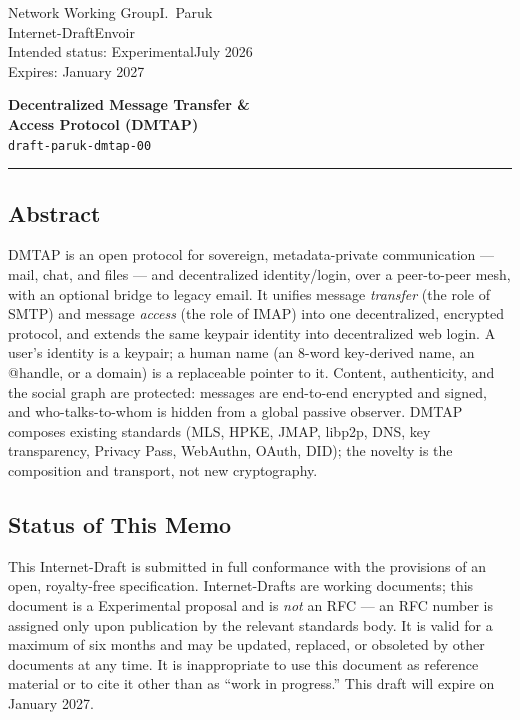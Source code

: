 \documentclass[11pt]{article}
\newcommand{\jobIDname}{draft-paruk-dmtap-00}
\newcommand{\jobIDdate}{July 2026}
\newcommand{\jobIDexpiry}{January 2027}
\newcommand{\jobIDstatus}{Experimental}
\begin{document}
\sloppy

\thispagestyle{empty}
\begin{flushleft}
{\small\color{faintGray}
Network Working Group\hfill I.\ Paruk\\
Internet-Draft\hfill Envoir\\
Intended status: \jobIDstatus\hfill \jobIDdate\\
Expires: \jobIDexpiry\\[-0.3ex]
}
\end{flushleft}

\vspace{2.2cm}
\begin{center}
{\LARGE\bfseries\color{inkGray} Decentralized Message Transfer \&\\[2pt] Access Protocol (DMTAP)}\\[6pt]
{\large\color{envoirViolet}\texttt{\jobIDname}}\\[10pt]
{\color{faintGray}\rule{0.5\linewidth}{0.6pt}}
\end{center}

\vspace{0.8cm}
\subsection*{Abstract}
DMTAP is an open protocol for sovereign, metadata-private communication --- mail,
chat, and files --- and decentralized identity/login, over a peer-to-peer mesh, with
an optional bridge to legacy email. It unifies message \emph{transfer} (the role of
SMTP) and message \emph{access} (the role of IMAP) into one decentralized, encrypted
protocol, and extends the same keypair identity into decentralized web login. A user's
identity is a keypair; a human name (an 8-word key-derived name, an @handle, or a
domain) is a replaceable pointer to it. Content, authenticity, and the social graph are
protected: messages are end-to-end encrypted and signed, and who-talks-to-whom is hidden
from a global passive observer. DMTAP composes existing standards (MLS, HPKE, JMAP,
libp2p, DNS, key transparency, Privacy Pass, WebAuthn, OAuth, DID); the novelty is the
composition and transport, not new cryptography.

\subsection*{Status of This Memo}
{\small This Internet-Draft is submitted in full conformance with the provisions of an
open, royalty-free specification. Internet-Drafts are working documents; this document
is a \jobIDstatus{} proposal and is \emph{not} an RFC --- an RFC number is assigned only
upon publication by the relevant standards body. It is valid for a maximum of six months
and may be updated, replaced, or obsoleted by other documents at any time. It is
inappropriate to use this document as reference material or to cite it other than as
``work in progress.'' This draft will expire on \jobIDexpiry.}
\end{document}
